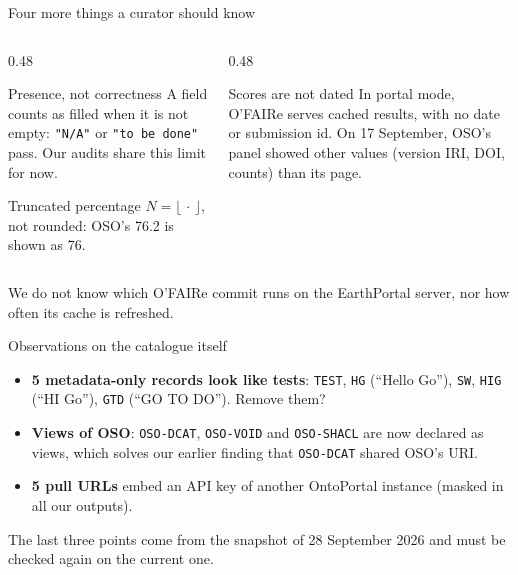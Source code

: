 \documentclass[aspectratio=169,10pt]{beamer}
\newcommand{\evidence}[1]{{\scriptsize\color{dtgrey}#1}}
\newcommand{\code}[1]{{\color{dtblue}\texttt{#1}}}
\begin{document}
\begin{frame}{Four more things a curator should know}
  \begin{columns}[T]
    \begin{column}{0.48\textwidth}
      \begin{block}{Presence, not correctness}
        \small A field counts as filled when it is not empty: \code{"N/A"} or \code{"to be done"} pass.
        Our audits share this limit for now.
      \end{block}
      \begin{block}{Truncated percentage}
        \small $N = \lfloor\,\cdot\,\rfloor$, not rounded: OSO's 76.2 is shown as 76.
      \end{block}
    \end{column}
    \begin{column}{0.48\textwidth}
      \begin{alertblock}{Scores are not dated}
        \small In portal mode, O'FAIRe serves cached results, with no date or submission id. On 17 September,
        OSO's panel showed other values (version IRI, DOI, counts) than its page.
      \end{alertblock}
    \end{column}
  \end{columns}
  \vfill
  \evidence{We do not know which O'FAIRe commit runs on the EarthPortal server, nor how often its cache is refreshed.}
\end{frame}

\begin{frame}{Observations on the catalogue itself}
  \small
  \begin{itemize}
    \item \textbf{5 metadata-only records look like tests}: \code{TEST}, \code{HG} (``Hello Go''),
          \code{SW}, \code{HIG} (``HI Go''), \code{GTD} (``GO TO DO''). Remove them?
    \item \textbf{Views of OSO}: \code{OSO-DCAT}, \code{OSO-VOID} and \code{OSO-SHACL} are now declared as views,
          which solves our earlier finding that \code{OSO-DCAT} shared OSO's URI.
    \item \textbf{5 pull URLs} embed an API key of another OntoPortal instance (masked in all our outputs).
  \end{itemize}
  \vfill
  \evidence{The last three points come from the snapshot of 28 September 2026 and must be checked again on the current one.}
\end{frame}
\end{document}
